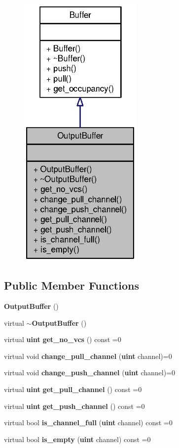 \begin{figure}[H]
\begin{center}
\leavevmode
\includegraphics[width=172pt]{classOutputBuffer__coll__graph}
\end{center}
\end{figure}
\subsection*{Public Member Functions}
\begin{CompactItemize}
\item 
{\bf OutputBuffer} ()
\item 
virtual {\bf $\sim$OutputBuffer} ()
\item 
virtual {\bf uint} {\bf get\_\-no\_\-vcs} () const =0
\item 
virtual void {\bf change\_\-pull\_\-channel} ({\bf uint} channel)=0
\item 
virtual void {\bf change\_\-push\_\-channel} ({\bf uint} channel)=0
\item 
virtual {\bf uint} {\bf get\_\-pull\_\-channel} () const =0
\item 
virtual {\bf uint} {\bf get\_\-push\_\-channel} () const =0
\item 
virtual bool {\bf is\_\-channel\_\-full} ({\bf uint} channel) const =0
\item 
virtual bool {\bf is\_\-empty} ({\bf uint} channel) const =0
\end{CompactItemize}


